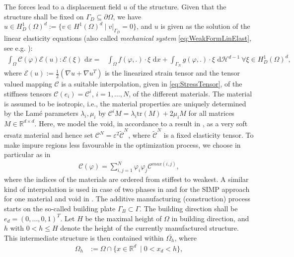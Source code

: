 \documentclass[a4paper,11pt]{article}
\theoremstyle{remark}
\newcommand{\dx}{\text{ d}x}
\newcommand{\dH}{\text{ d}\mathcal{H}^{d-1}}
\newcommand{\intO}{\int_{\Omega}}
\newcommand{\intG}{\int_{\Gamma_{N}}}
\begin{document}
%
The forces lead to a displacement field $u$ of the structure.
Given that the structure shall be fixed on $\Gamma_D\subseteq\partial\Omega$, we have $u \in H^1_{D}(\Omega)^d:= \{v \in H^1(\Omega)^d \mid v|_{\Gamma_D}=0 \}$, and $u$ is given as the solution of the linear elasticity equations (also called {\em mechanical system} \eqref{eq:WeakFormLinElast}, see e.g. \cite{AllaireOverview2,WIAS}):
\begin{align}
\label{eq:WeakFormLinElast}
  \intO \mathcal{C}(\varphi)\mathcal{E}(u):\mathcal{E}(\xi) \dx =& \intO f(\varphi,.) \cdot \xi \dx %
  + %
  \intG g(\varphi,.) \cdot \xi\dH\ %
 \forall\xi\in H^1_{D}(\Omega)^d, \tag{MS}
\end{align}
where $\mathcal{E}(u) := \frac 1 2 (\nabla u + \nabla u^T)$ is the linearized strain tensor and the tensor valued mapping $\mathcal{C}$ is a suitable interpolation, given in \eqref{eq:StressTensor}, of the stiffness tensors $\mathcal{C}( e_i)=\mathcal{C}^i$, $i=1,\ldots , N$,  of the different materials. The material is assumed to be isotropic, i.e., the material properties are uniquely determined by the Lamé parameters $\lambda_i,\mu_i$ by $\mathcal{C}^iM = \lambda_i \text{tr}(M) + 2\mu_i M$ for all matrices $M \in\mathbb{R}^{d\times d}$.
Here, we model the void, in accordance to a result in \cite{BFGS14}, as a very soft ersatz material and hence set
$\mathcal{C}^N  = \varepsilon^2 \tilde{\mathcal{C}}^N$, where $\tilde{\mathcal{C}}^N$
is a fixed elasticity tensor.
To make impure regions less favourable in the optimization process, we choose in particular as in \cite{BFGRS14} 
\begin{align}
\label{eq:StressTensor}
\mathcal{C}(\varphi) = \sum_{i,j=1}^N \varphi_i\varphi_j\mathcal{C}^{max(i,j)},
\end{align}
where the indices of the materials are ordered from stiffest to weakest.
A similar kind of interpolation is used in case of two phases in \cite{BC06,PRW12,WR12} and for the SIMP approach for one material and void in \cite{BenSig03}. 
The additive manufacturing (construction) process  starts
on the so-called building plate
$\Gamma_B\subset\Gamma$.
The building direction shall be $e_d = (0,\dots, 0,1)^T$.
Let $H$ be the maximal height of $\Omega$ in building direction, and
$h$ with $0<h\leq H$ denote the height of the
currently manufactured structure.
This intermediate structure is then contained within $\overline{\Omega_h}$, where
\begin{align}
\label{eq:InterStruc}
\Omega_h &:= \Omega \cap 
\{x\in\mathbb{R}^d\ \mid 0 < x_d < h \},
\end{align}
\end{document}
